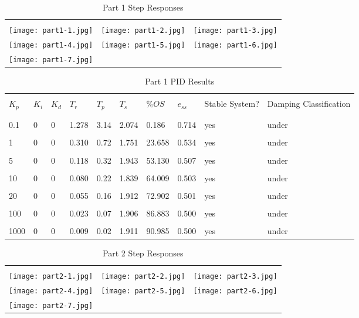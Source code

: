 
\begin{table}[H]
\begin{tabular}{ccc}
\toprule
\\ \texttt{[image: part1-1.jpg]} 
& \texttt{[image: part1-2.jpg]} 
& \texttt{[image: part1-3.jpg]} 
\\ \texttt{[image: part1-4.jpg]} 
& \texttt{[image: part1-5.jpg]} 
& \texttt{[image: part1-6.jpg]} 
\\ \texttt{[image: part1-7.jpg]} 
\\ \bottomrule
\end{tabular}
\caption{Part 1 Step Responses}
  \label{tab:part1Response}
\end{table}
\begin{table}[H]
	\begin{tabularx}{\textwidth}{XXXXXXXXXX}
		\toprule
		\\ $K_p$ & $K_i$ & $K_d$ & $T_r$ & $T_p$ & $T_s$ & $\%OS$ & $e_{ss}$ 
		& Stable System? & Damping Classification
		\\ \midrule
		
\\\midrule\\0.1&0&0&1.278&3.14&2.074&0.186&0.714&yes&under 
\\\midrule\\1&0&0&0.310&0.72&1.751&23.658&0.534&yes&under 
\\\midrule\\5&0&0&0.118&0.32&1.943&53.130&0.507&yes&under 
\\\midrule\\10&0&0&0.080&0.22&1.839&64.009&0.503&yes&under 
\\\midrule\\20&0&0&0.055&0.16&1.912&72.902&0.501&yes&under 
\\\midrule\\100&0&0&0.023&0.07&1.906&86.883&0.500&yes&under 
\\\midrule\\1000&0&0&0.009&0.02&1.911&90.985&0.500&yes&under 
		\\ \bottomrule
	\end{tabularx}
	\caption{Part 1 PID Results}
	\label{tab:pid1SimResults}
\end{table}
\begin{table}[H]
\begin{tabular}{ccc}
\toprule
\\ \texttt{[image: part2-1.jpg]} 
& \texttt{[image: part2-2.jpg]} 
& \texttt{[image: part2-3.jpg]} 
\\ \texttt{[image: part2-4.jpg]} 
& \texttt{[image: part2-5.jpg]} 
& \texttt{[image: part2-6.jpg]} 
\\ \texttt{[image: part2-7.jpg]} 
\\ \bottomrule
\end{tabular}
\caption{Part 2 Step Responses}
  \label{tab:part2Response}
\end{table}
